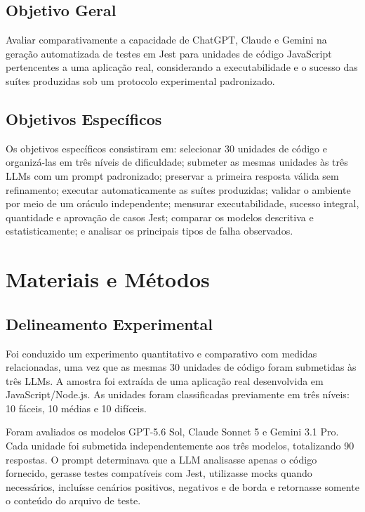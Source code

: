 \documentclass[12pt]{article}
\begin{document}
\subsection{Objetivo Geral}

Avaliar comparativamente a capacidade de ChatGPT, Claude e Gemini na geração automatizada de testes em Jest para unidades de código JavaScript pertencentes a uma aplicação real, considerando a executabilidade e o sucesso das suítes produzidas sob um protocolo experimental padronizado.

\subsection{Objetivos Específicos}

Os objetivos específicos consistiram em: selecionar 30 unidades de código e organizá-las em três níveis de dificuldade; submeter as mesmas unidades às três LLMs com um prompt padronizado; preservar a primeira resposta válida sem refinamento; executar automaticamente as suítes produzidas; validar o ambiente por meio de um oráculo independente; mensurar executabilidade, sucesso integral, quantidade e aprovação de casos Jest; comparar os modelos descritiva e estatisticamente; e analisar os principais tipos de falha observados.

\section{Materiais e Métodos}

\subsection{Delineamento Experimental}

Foi conduzido um experimento quantitativo e comparativo com medidas relacionadas, uma vez que as mesmas 30 unidades de código foram submetidas às três LLMs. A amostra foi extraída de uma aplicação real desenvolvida em JavaScript/Node.js. As unidades foram classificadas previamente em três níveis: 10 fáceis, 10 médias e 10 difíceis.

Foram avaliados os modelos GPT-5.6 Sol, Claude Sonnet 5 e Gemini 3.1 Pro. Cada unidade foi submetida independentemente aos três modelos, totalizando 90 respostas. O prompt determinava que a LLM analisasse apenas o código fornecido, gerasse testes compatíveis com Jest, utilizasse mocks quando necessários, incluísse cenários positivos, negativos e de borda e retornasse somente o conteúdo do arquivo de teste.
\end{document}
